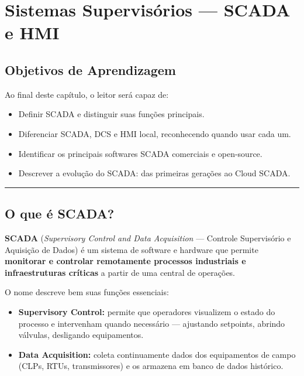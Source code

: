 \chapter{\texorpdfstring{Sistemas Supervisórios --- SCADA e HMI}{Sistemas Supervisórios  SCADA e HMI}}\label{sistemas-supervisuxf3rios-scada-e-hmi}

\section*{Objetivos de Aprendizagem}

Ao final deste capítulo, o leitor será capaz de:

\begin{itemize}
\tightlist
\item
  Definir SCADA e distinguir suas funções principais.
\item
  Diferenciar SCADA, DCS e HMI local, reconhecendo quando usar cada um.
\item
  Identificar os principais softwares SCADA comerciais e open-source.
\item
  Descrever a evolução do SCADA: das primeiras gerações ao Cloud SCADA.
\end{itemize}

\begin{center}\rule{0.5\linewidth}{0.5pt}\end{center}

\section{O que é SCADA?}\label{o-que-uxe9-scada}

\textbf{SCADA} (\emph{Supervisory Control and Data Acquisition} --- Controle Supervisório e Aquisição de Dados) é um sistema de software e hardware que permite \textbf{monitorar e controlar remotamente processos industriais e infraestruturas críticas} a partir de uma central de operações.

O nome descreve bem suas funções essenciais:

\begin{itemize}
\tightlist
\item
  \textbf{Supervisory Control:} permite que operadores visualizem o estado do processo e intervenham quando necessário --- ajustando setpoints, abrindo válvulas, desligando equipamentos.
\item
  \textbf{Data Acquisition:} coleta continuamente dados dos equipamentos de campo (CLPs, RTUs, transmissores) e os armazena em banco de dados histórico.
\end{itemize}

